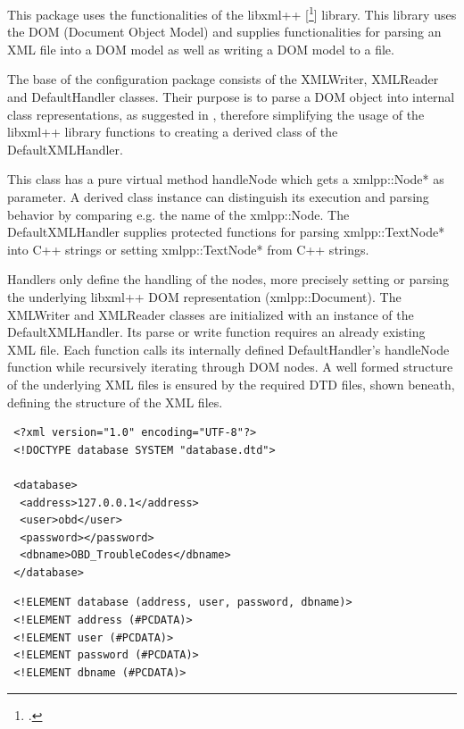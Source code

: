 This package uses the functionalities of the libxml++ [\footcite{XMLLIB}] library. This library uses the DOM (Document Object Model) and supplies functionalities 
for parsing an XML file into a DOM model as well as writing a DOM model to a file. 

The base of the configuration package consists of the XMLWriter, XMLReader and DefaultHandler classes. Their purpose is to parse a DOM object 
into internal class representations, as suggested in , therefore simplifying the usage of the libxml++ library functions to creating 
a derived class of the DefaultXMLHandler. 

This class has a pure virtual method handleNode which gets a xmlpp::Node* as parameter. A derived class instance can distinguish its execution 
and parsing behavior by comparing e.g. the name of the xmlpp::Node. The DefaultXMLHandler supplies protected functions for parsing 
xmlpp::TextNode* into C++ strings or setting xmlpp::TextNode* from C++ strings. 

Handlers only define the handling of the nodes, more precisely setting  or parsing the underlying libxml++ DOM representation (xmlpp::Document). 
The XMLWriter and XMLReader classes are initialized with an instance of the DefaultXMLHandler. Its parse or write function requires an already 
existing XML file. Each function calls its internally defined DefaultHandler’s handleNode function while recursively iterating through DOM nodes. 
A well formed structure of the underlying XML files is ensured by the required DTD files, shown beneath, defining the structure of the XML files.

\begin{verbatim}
 <?xml version="1.0" encoding="UTF-8"?>
 <!DOCTYPE database SYSTEM "database.dtd">

 <database>
  <address>127.0.0.1</address>
  <user>obd</user>
  <password></password>
  <dbname>OBD_TroubleCodes</dbname>
 </database>
\end{verbatim}

\begin{verbatim}
 <!ELEMENT database (address, user, password, dbname)>
 <!ELEMENT address (#PCDATA)>
 <!ELEMENT user (#PCDATA)>
 <!ELEMENT password (#PCDATA)>
 <!ELEMENT dbname (#PCDATA)>
\end{verbatim}

